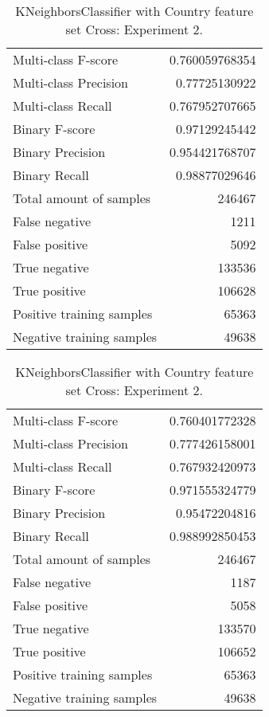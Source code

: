 \begin{table}[H]
\begin{minipage}{0.5\textwidth}
\caption{KNeighborsClassifier with Country feature set Cross: Experiment 1.}
\centering
\begin{tabular}{l r}
\toprule
Multi-class F-score & 0.760059768354 \\
Multi-class Precision & 0.77725130922 \\
Multi-class Recall & 0.767952707665 \\
\midrule
Binary F-score & 0.97129245442 \\
Binary Precision & 0.954421768707 \\
Binary Recall & 0.98877029646 \\
\midrule
Total amount of samples & 246467 \\
False negative & 1211 \\
False positive & 5092 \\
True negative & 133536 \\
True positive & 106628 \\
\midrule
Positive training samples & 65363 \\
Negative training samples & 49638 \\
\bottomrule
\end{tabular}
\end{minipage}
\hfillx
\begin{minipage}{0.5\textwidth}
\caption{KNeighborsClassifier with Country feature set Cross: Experiment 2.}
\centering
\begin{tabular}{l r}
\toprule
Multi-class F-score & 0.760401772328 \\
Multi-class Precision & 0.777426158001 \\
Multi-class Recall & 0.767932420973 \\
\midrule
Binary F-score & 0.971555324779 \\
Binary Precision & 0.95472204816 \\
Binary Recall & 0.988992850453 \\
\midrule
Total amount of samples & 246467 \\
False negative & 1187 \\
False positive & 5058 \\
True negative & 133570 \\
True positive & 106652 \\
\midrule
Positive training samples & 65363 \\
Negative training samples & 49638 \\
\bottomrule
\end{tabular}
\end{minipage}
\end{table}
